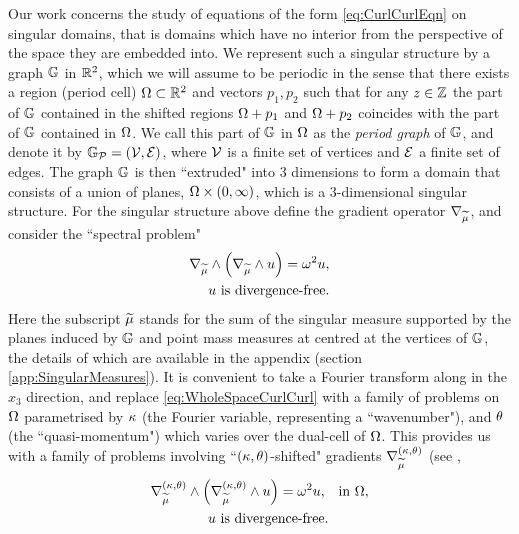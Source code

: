 Our work concerns the study of equations of the form \eqref{eq:CurlCurlEqn} on singular domains, that is domains which have no interior from the perspective of the space they are embedded into.
We represent such a singular structure by a graph $\mathbb{G}$ in $\mathbb{R}^2$, which we will assume to be periodic in the sense that there exists a region (period cell) $\Omega\subset\mathbb{R}^2$ and vectors $p_1, p_2$ such that for any $z\in\mathbb{Z}$ the part of $\mathbb{G}$ contained in the shifted regions $\Omega+p_1$ and $\Omega+p_2$ coincides with the part of $\mathbb{G}$ contained in $\Omega$.
We call this part of $\mathbb{G}$ in $\Omega$ as the \emph{period graph} of $\mathbb{G}$, and denote it by $\mathbb{G}_{\mathcal{P}}=\left( \mathcal{V}, \mathcal{E} \right)$, where $\mathcal{V}$ is a finite set of vertices and $\mathcal{E}$ a finite set of edges.
The graph $\mathbb{G}$ is then ``extruded" into 3 dimensions to form a domain that consists of a union of planes, $\Omega\times\left( 0,\infty \right)$, which is a 3-dimensional singular structure.
For the singular structure above define the gradient operator $\nabla_{\widetilde{\mu}}$, and consider the ``spectral problem"
\begin{subequations} \label{eq:WholeSpaceCurlCurl}
	\begin{align} 
		\nabla_{\widetilde{\mu}}\wedge \left(  \nabla_{\widetilde{\mu}}\wedge u  \right) = \omega^2 u &, \\
		u \text{ is divergence-free} &.
	\end{align}
\end{subequations}
Here the subscript $\widetilde{\mu}$ stands for the sum of the singular measure supported by the planes induced by $\mathbb{G}$ and point mass measures at centred at the vertices of $\mathbb{G}$, the details of which are available in the appendix (section \ref{app:SingularMeasures}).
It is convenient to take a Fourier transform along in the $x_3$ direction, and replace \eqref{eq:WholeSpaceCurlCurl} with a family of problems on $\Omega$ parametrised by $\kappa$ (the Fourier variable, representing a ``wavenumber"), and $\theta$ (the ``quasi-momentum") which varies over the dual-cell of $\Omega$.
This provides us with a family of problems involving ``$\left( \kappa, \theta \right)$-shifted" gradients $\nabla^{\left( \kappa, \theta \right)}_{\widetilde{\mu}}$ (see ,
\begin{subequations} \label{eq:PeriodCellCurlCurlStrongForm}
	\begin{align} 
		\nabla_{\widetilde{\mu}}^{\left( \kappa, \theta \right)}\wedge \left(  \nabla_{\widetilde{\mu}}^{\left( \kappa, \theta \right)}\wedge u  \right) = \omega^2 u, & \quad\text{in } \Omega, \\
		u \text{ is divergence-free} &.
	\end{align}
\end{subequations}
